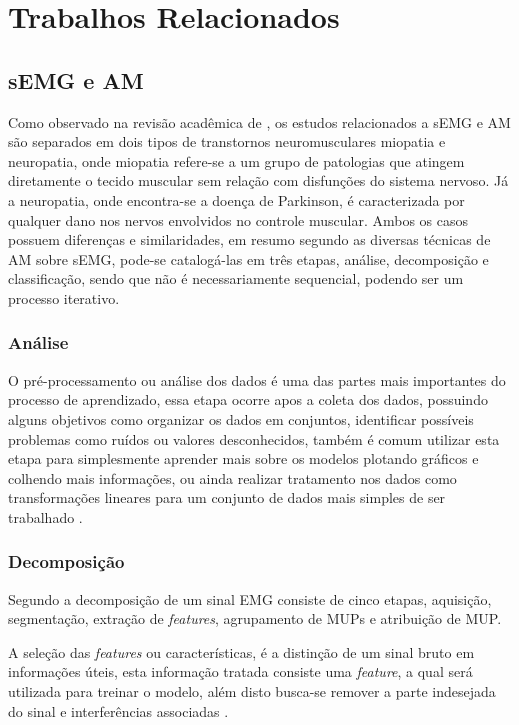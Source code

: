 \chapter[TrabalhosRelacionados]{Trabalhos Relacionados}

\section{sEMG e AM}
Como observado na revisão acadêmica de \cite{yousefi2014characterizing}, os estudos relacionados a sEMG e AM são separados em  dois tipos de transtornos neuromusculares miopatia e neuropatia, onde miopatia refere-se a um grupo de patologias que atingem diretamente o tecido muscular sem relação com disfunções do sistema nervoso. Já a neuropatia, onde encontra-se a doença de Parkinson, é caracterizada por qualquer dano nos nervos envolvidos no controle muscular. Ambos os casos possuem diferenças e similaridades, em resumo segundo \cite{yousefi2014characterizing} as diversas técnicas de AM sobre sEMG, pode-se catalogá-las em três etapas, análise, decomposição e classificação, sendo que não é necessariamente sequencial, podendo ser um processo iterativo.

\subsection{Análise}
O pré-processamento ou análise dos dados é uma das partes mais importantes do processo de aprendizado, essa etapa ocorre apos a coleta dos dados, possuindo alguns objetivos como organizar os dados em conjuntos, identificar possíveis problemas como ruídos ou valores desconhecidos, também é comum utilizar esta etapa para simplesmente aprender mais sobre os modelos plotando gráficos e colhendo mais informações, ou ainda realizar tratamento nos dados como transformações lineares para um conjunto de dados mais simples de ser trabalhado \cite{batista2003pre}. 

\subsection{Decomposição}
Segundo  a decomposição de um sinal EMG consiste de cinco etapas, aquisição, segmentação, extração de \textit{features}, agrupamento de MUPs e atribuição de MUP.

A seleção das \textit{features} ou características, é a distinção de um sinal bruto em informações úteis, esta informação tratada consiste uma \textit{feature}, a qual será utilizada para treinar o modelo, além disto busca-se remover a parte indesejada do sinal e interferências associadas \cite{phinyomark2012feature}.

